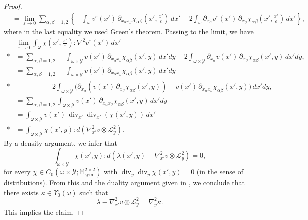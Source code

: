 \documentclass[reqno,10pt]{amsart}
\numberwithin{equation}{section}
\theoremstyle{remark}
\newcommand{\calL}{\mathcal{L}}
\newcommand{\M}{\mathbb{M}}
\newcommand{\calY}{\mathcal{Y}}
\DeclareMathOperator{\sym}{sym}
\renewcommand{\div}{\operatorname{div}}
\newcommand{\eps}{\varepsilon}
\newcommand{\calYzero}[1]{\Upsilon_0({#1})}
\newcommand{\D}{\nabla}
\begin{document}
\begin{proof}
{\begin{align*}
	& = \lim_{\eps\to0} \sum_{\alpha,\beta=1,2} \left\{- \int_{\omega} v^\eps(x')\,\partial_{x_\alpha x_\beta}\chi_{\alpha \beta}\left(x',\frac{x'}{\eps}\right) \,dx' - 2 \int_{\omega} \partial_{x_\alpha}v^\eps(x')\,\partial_{x_\beta}\chi_{\alpha \beta}\left(x',\frac{x'}{\eps}\right) \,dx'\right\},
\end{align*}
}\noindent
where in the last equality we used Green's theorem. 
Passing to the limit, we have
{\allowdisplaybreaks
\begin{align}
	\nonumber & \lim_{\eps\to0} \int_{\omega} \chi\left(x',\frac{x'}{\eps}\right) : {\D}^2v^\eps(x') \,dx'\\*
	\nonumber & = \sum_{\alpha,\beta=1,2} - \int_{\omega \times \calY} v(x')\,\partial_{x_\alpha x_\beta}\chi_{\alpha \beta}\left(x',y\right) \,dx' dy - 2 \int_{\omega \times \calY} \partial_{x_\alpha}v(x')\,\partial_{x_\beta}\chi_{\alpha \beta}\left(x',y\right) \,dx' dy,\\
	\nonumber & = \sum_{\alpha,\beta=1,2} - \int_{\omega \times \calY} v(x')\,\partial_{x_\alpha x_\beta}\chi_{\alpha \beta}\left(x',y\right) \,dx' dy \\*\nonumber& \hspace{4em}- 2 \int_{\omega \times \calY} \bigg( \partial_{x_\alpha}\left( v(x')\,\partial_{x_\beta}\chi_{\alpha \beta}\left(x',y\right) \right) - v(x')\,\partial_{x_\alpha x_\beta}\chi_{\alpha \beta}\left(x',y\right) \bigg) \,dx' dy,\\
	\nonumber & = \sum_{\alpha,\beta=1,2} \int_{\omega \times \calY} v(x')\,\partial_{x_\alpha x_\beta}\chi_{\alpha \beta}\left(x',y\right) \,dx' dy\\
	\nonumber & = \int_{\omega \times \calY} v(x')\,\div_{x'}\div_{x'}\left(\chi\left(x',y\right)\right) \,dx'\\* 
	& = \int_{\omega \times \calY} \chi(x',y) : d\left({\D}^2_{x'}v \otimes \calL^{2}_{y} \right).
\end{align}
}\noindent
By a density argument, we infer that
\begin{equation*}
	\int_{\omega \times \calY} \chi(x',y) : d\left(\lambda(x',y) - {\D}^2_{x'}v \otimes \calL^{2}_{y} \right) = 0,
\end{equation*}
for every $\chi \in C_0(\omega \times \calY;\M^{2 \times 2}_{\sym})$ with $\div_{y}\div_{y}\chi(x',y) = 0$ (in the sense of distributions). 
From this and 
the duality argument given in \cite[Proposition 4.8]{Buzancic.Davoli.Velcic.2024.2nd},
we conclude that there exists $\kappa \in \calYzero{\omega}$ such that 
\begin{equation*}
	\lambda - {\D}^2_{x'}v \otimes \calL^{2}_{y} = {\D}^2_{y}\kappa.
\end{equation*}
This implies the claim.
\end{proof}
\end{document}
